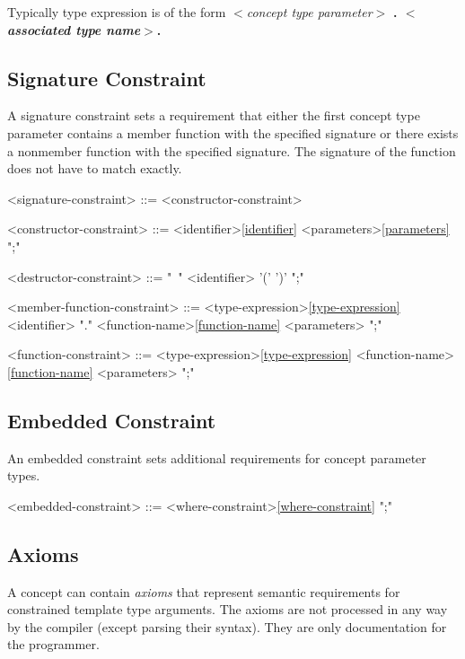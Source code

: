 \documentclass[a4paper,oneside,11pt]{article}
\begin{document}
Typically type expression is of the form \emph{$<$concept type parameter$>$} \bf{.} \emph{$<$associated type name$>$}.

\subsection{Signature Constraint}

A signature constraint sets a requirement that either the first concept type parameter contains a member function with the specified signature or there exists a nonmember function with the specified signature.
The signature of the function does not have to match exactly.

\begin{grammar}
\label{signature-constraint}<signature-constraint> ::= <constructor-constraint>

<constructor-constraint> ::= <identifier>\ref{identifier} <parameters>\ref{parameters} ";"

<destructor-constraint> ::= "~" <identifier> '(' ')' ";"

<member-function-constraint> ::= <type-expression>\ref{type-expression}\\
<identifier> "." <function-name>\ref{function-name} <parameters> ";"

<function-constraint> ::= <type-expression>\ref{type-expression} <function-name>\ref{function-name} <parameters> ";"
\end{grammar}

\subsection{Embedded Constraint}

An embedded constraint sets additional requirements for concept parameter types.

\begin{grammar}
\label{embedded-constraint}<embedded-constraint> ::= <where-constraint>\ref{where-constraint} ";"
\end{grammar}

\subsection{Axioms}

A concept can contain \emph{axioms} that represent semantic requirements for constrained template type arguments.
The axioms are not processed in any way by the compiler (except parsing their syntax).
They are only documentation for the programmer.
\end{document}
